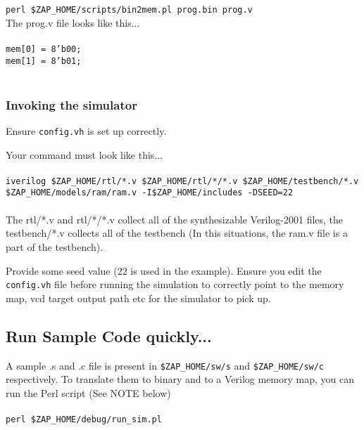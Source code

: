 \documentclass[11pt]{article}
\begin{document}
\texttt{perl \$ZAP\_HOME/scripts/bin2mem.pl prog.bin prog.v}\\
The prog.v file looks like this...\\\\
\texttt{mem[0] = 8'b00;} \\
\texttt{mem[1] = 8'b01;} \\\\


\subsubsection{Invoking the simulator}
Ensure \texttt{config.vh} is set up correctly.

Your command must look like this...\\\\

\texttt{iverilog \$ZAP\_HOME/rtl/*.v \$ZAP\_HOME/rtl/*/*.v 
\$ZAP\_HOME/testbench/*.v \$ZAP\_HOME/models/ram/ram.v -I\$ZAP\_HOME/includes  
-DSEED=22}\\\\

The rtl/*.v and rtl/*/*.v collect all of the synthesizable Verilog-2001 files,
the testbench/*.v collects all of the testbench (In this situations, the ram.v
file is a part of the testbench).

Provide some seed value (22 is used in the example). Ensure you edit the 
\texttt{config.vh} file before running the simulation to correctly point to the
memory map, vcd target output path etc for the simulator to pick up.


\subsection{Run Sample Code quickly...}

A sample .s and .c file is present in \texttt{\$ZAP\_HOME/sw/s} and 
\texttt{\$ZAP\_HOME/sw/c} respectively. To translate them to binary and to a 
Verilog memory map, you can run the Perl script (See NOTE below) \\\\ 

\texttt{perl \$ZAP\_HOME/debug/run\_sim.pl} \\\\ 
\end{document}

